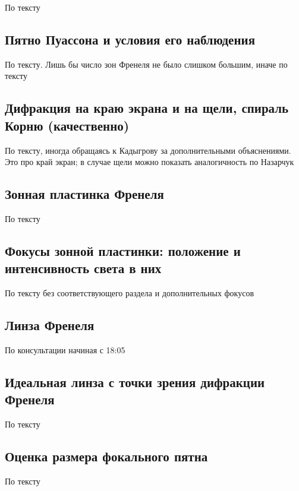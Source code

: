 \documentclass[a4paper, 14pt]{article}
\begin{document}
    По тексту
    
    \subsection{Пятно Пуассона и условия его наблюдения}
    
    По тексту.
    Лишь бы число зон Френеля не было слишком большим, иначе по тексту
    
    \subsection{Дифракция на краю экрана и на щели, спираль Корню (качественно)}
    
    По тексту, иногда обращаясь к Кадыгрову за дополнительными объяснениями.
    Это про край экран; в случае щели можно показать аналогичность по Назарчук
    
    \subsection{Зонная пластинка Френеля}
    
    По тексту
    
    \subsection{Фокусы зонной пластинки: положение и интенсивность света в них}
    
    По тексту без соответствующего раздела и дополнительных фокусов
    
    \subsection{Линза Френеля}
    
    По консультации начиная с 18:05
    
    \subsection{Идеальная линза с точки зрения дифракции Френеля}
    
    По тексту
    
    \subsection{Оценка размера фокального пятна}
    
    По тексту
    
\end{document}

